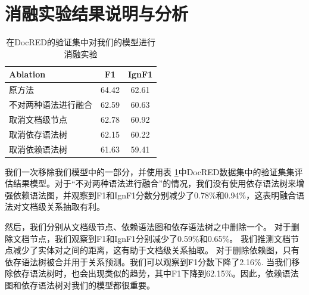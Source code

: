\documentclass[bachelor]{thesis-uestc}
\begin{document}
\section{消融实验结果说明与分析}\label{sec:inter}

\begin{table}[]
    \caption{在DocRED的验证集中对我们的模型进行消融实验}
    \begin{tabular}{llc}
    \hline
    Ablation              & \multicolumn{1}{c}{F1} & \multicolumn{1}{l}{IgnF1} \\ \hline
    原方法             & 64.42                  & 62.61                     \\ 
    不对两种语法进行融合   & 62.59                  & 60.63                     \\
    取消文档级节点 & 62.78                   & 60.92                     \\
    取消依存语法树 & 62.15                  & 60.22                     \\ 
    取消依赖语法树   & 61.63                  & 59.41                     \\
    \hline
    \end{tabular}
    \label{fig_ablation}
\end{table}

我们一次移除我们模型中的一部分，并使用表 \ref{fig_ablation}中DocRED数据集中的验证集集评估结果模型。对于“不对两种语法进行融合”的情况，我们没有使用依存语法树来增强依赖语法图，并观察到F1和IgnF1分数分别减少了0.78\%和0.94\%，这表明融合语法对文档级关系抽取有利。\par
然后，我们分别从文档级节点、依赖语法图和依存语法树之中删除一个。
对于删除文档节点，我们观察到F1和IgnF1分别减少了0.59\%和0.65\%。
我们推测文档节点减少了实体对之间的距离，这有助于文档级关系抽取。
对于删除依赖图，只有依存语法树被合并用于关系预测。我们可以观察到F1分数下降了2.16\%. 当我们移除依存语法树时，也会出现类似的趋势，其中F1下降到62.15\%。因此，依赖语法图和依存语法树对我们的模型都很重要。\par
\end{document}
